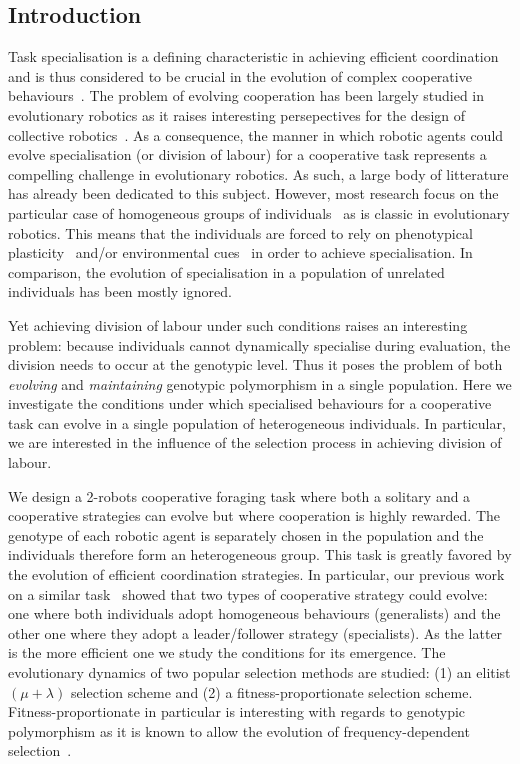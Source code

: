   \subsection{Introduction}
    Task specialisation is a defining characteristic in achieving efficient coordination and is thus considered to be crucial in the evolution of complex cooperative behaviours~\cite{Eors1995}. The problem of evolving cooperation has been largely studied in evolutionary robotics as it raises interesting persepectives for the design of collective robotics~\cite{Trianni2007, Hauert2014, Doncieux2015}. As a consequence, the manner in which robotic agents could evolve specialisation (or division of labour) for a cooperative task represents a compelling challenge in evolutionary robotics. As such, a large body of litterature has already been dedicated to this subject. However, most research focus on the particular case of homogeneous groups of individuals~\cite{Waibel2009} as is classic in evolutionary robotics. This means that the individuals are forced to rely on phenotypical plasticity~\cite{Waibel2006, Ferrante2015, Eskridge2015} and/or environmental cues~\cite{Waibel2006, Goldsby2010} in order to achieve specialisation. In comparison, the evolution of specialisation in a population of unrelated individuals has been mostly ignored.

    Yet achieving division of labour under such conditions raises an interesting problem: because individuals cannot dynamically specialise during evaluation, the division needs to occur at the genotypic level. Thus it poses the problem of both \emph{evolving} and \emph{maintaining} genotypic polymorphism in a single population. Here we investigate the conditions under which specialised behaviours for a cooperative task can evolve in a single population of heterogeneous individuals. In particular, we are interested in the influence of the selection process in achieving division of labour. 

    We design a 2-robots cooperative foraging task where both a solitary and a cooperative strategies can evolve but where cooperation is highly rewarded. The genotype of each robotic agent is separately chosen in the population and the individuals therefore form an heterogeneous group. This task is greatly favored by the evolution of efficient coordination strategies. In particular, our previous work on a similar task~\cite{Bernard2015} showed that two types of cooperative strategy could evolve: one where both individuals adopt homogeneous behaviours (generalists) and the other one where they adopt a leader/follower strategy (specialists). As the latter is the more efficient one we study the conditions for its emergence. The evolutionary dynamics of two popular selection methods are studied: (1) an elitist \((\mu + \lambda)\) selection scheme and (2) a fitness-proportionate selection scheme. Fitness-proportionate in particular is interesting with regards to genotypic polymorphism as it is known to allow the evolution of frequency-dependent selection~\cite{Altenberg1991}.

